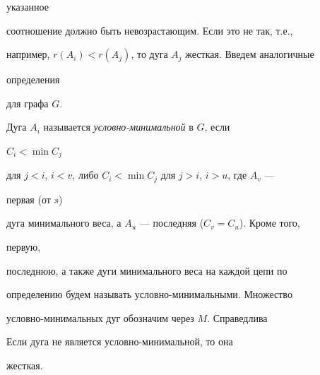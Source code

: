 указанное


соотношение должно быть невозрастающим. Если это не так, т.е.,


например, $r(A_i)<r(A_j)$, то дуга $A_j$ жесткая. Введем аналогичные


определения


для графа $G$.





Дуга $A_i$ называется {\em условно-минимальной} в $G$, если


$C_i<\min C_j$


для $j<i$, $i<v$, либо $C_i<\min C_j$ для $j>i$, $i>u$, где $A_v$ ---


первая (от $s$)


дуга минимального веса, а $A_u$ --- последняя ($C_v=C_u$). Кроме того,


первую,


последнюю, а также дуги минимального веса на каждой цепи по


определению будем называть условно-минимальными. Множество


условно-минимальных дуг обозначим через $M$. Справедлива





\begin{thm} Если дуга не является условно-минимальной, то она


жесткая.


\end{thm}





